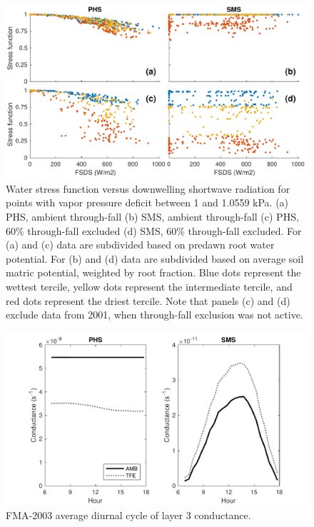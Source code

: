 \documentclass[draft,linenumbers]{agujournal}
\begin{document}
      \begin{figure}[h]
     \centering
     \includegraphics[width=30pc]{../figs2/suppfsds.pdf}
     \caption{Water stress function versus downwelling shortwave radiation for points with vapor pressure deficit between 1 and 1.0559 kPa.
     (a) PHS, ambient through-fall
     (b) SMS, ambient through-fall
     (c) PHS, 60\% through-fall excluded
     (d) SMS, 60\% through-fall excluded. 
     For (a) and (c) data are subdivided based on predawn root water potential.
     For (b) and (d) data are subdivided based on average soil matric potential, weighted by root fraction.
     Blue dots represent the wettest tercile, yellow dots represent the intermediate tercile, and red dots represent the driest tercile.
     Note that panels (c) and (d) exclude data from 2001, when through-fall exclusion was not active.
     }
     \label{supp:fsds}
       \end{figure}
  
        \begin{figure}[h]
     \centering
     \includegraphics[width=30pc]{../figs2/suppfig1.pdf}
     \caption{FMA-2003 average diurnal cycle of layer 3 conductance.}
     \label{supp:cond}
  \end{figure}
  \clearpage
  
\end{document}
